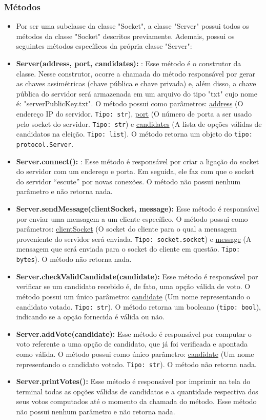 \documentclass[10pt]{article}
\begin{document}
\begin{itemize}
        \subsubsection{\large Métodos}
            \begin{itemize}
            \item Por ser uma subclasse da classe "Socket", a classe "Server" possui todos os métodos da classe "Socket" descritos previamente. Ademais, possui os seguintes métodos específicos da própria classe "Server":
            \item \textbf{Server(address, port, candidates):} : Esse método é o construtor da classe. Nesse construtor, ocorre a chamada do método responsável por gerar as chaves assimétricas (chave pública e chave privada) e, além disso, a chave pública do servidor será armazenada em um arquivo do tipo "txt" cujo nome é: "serverPublicKey.txt". O método possui como parâmetros: \underline{address} (O endereço IP do servidor. \texttt{Tipo: str}), \underline{port} (O número de porta a ser usado pelo socket do servidor. \texttt{Tipo: str}) e \underline{candidates} (A lista de opções válidas de candidatos na eleição. \texttt{Tipo: list}). O método retorna um objeto do \texttt{tipo: protocol.Server}.
            \item \textbf{Server.connect():} : Esse método é responsável por criar a ligação do socket do servidor com um endereço e porta. Em seguida, ele faz com que o socket do servidor “escute” por novas conexões. O método não possui nenhum parâmetro e não retorna nada.
            \item \textbf{Server.sendMessage(clientSocket, message):} Esse método é responsável por enviar uma mensagem a um cliente específico. O método possui como parâmetros: \underline{clientSocket} (O socket do cliente para o qual a mensagem proveniente do servidor será enviada. \texttt{Tipo: socket.socket}) e \underline{message} (A mensagem que será enviada para o socket do cliente em questão. \texttt{Tipo: bytes}). O método não retorna nada.
            \item \textbf{Server.checkValidCandidate(candidate):}  Esse método é responsável por verificar se um candidato recebido é, de fato, uma opção válida de voto. O método possui um único parâmetro: \underline{candidate} (Um nome representando o candidato votado. \texttt{Tipo: str}). O método retorna um booleano (\texttt{tipo: bool}), indicando se a opção fornecida é válida ou não.
            \item \textbf{Server.addVote(candidate):} Esse método é responsável por computar o voto referente a uma opção de candidato, que já foi verificada e apontada como válida. O método possui como único parâmetro: \underline{candidate} (Um nome representando o candidato votado. \texttt{Tipo: str}). O método não retorna nada.
            \item \textbf{Server.printVotes():} Esse método é responsável por imprimir na tela do terminal todas as opções válidas de candidatos e a quantidade respectiva dos seus votos computados até o momento da chamada do método. Esse método não possui nenhum parâmetro e não retorna nada.
            \end{itemize}
        

\end{itemize}
\end{document}
